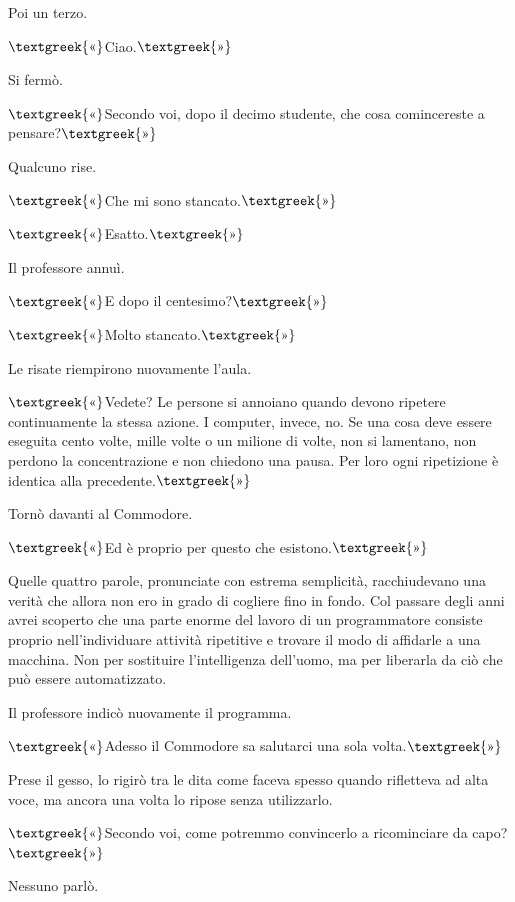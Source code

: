 \documentclass{article}
\begin{document}
Poi un terzo.

$\text{\textgreek{«}}$Ciao.$\text{\textgreek{»}}$

Si fermò.

$\text{\textgreek{«}}$Secondo voi, dopo il decimo studente, che cosa comincereste a pensare?$\text{\textgreek{»}}$

Qualcuno rise.

$\text{\textgreek{«}}$Che mi sono stancato.$\text{\textgreek{»}}$

$\text{\textgreek{«}}$Esatto.$\text{\textgreek{»}}$

Il professore annuì.

$\text{\textgreek{«}}$E dopo il centesimo?$\text{\textgreek{»}}$

$\text{\textgreek{«}}$Molto stancato.$\text{\textgreek{»}}$

Le risate riempirono nuovamente l'aula.

$\text{\textgreek{«}}$Vedete? Le persone si annoiano quando devono ripetere continuamente la stessa azione. I computer,
invece, no. Se una cosa deve essere eseguita cento volte, mille volte o un milione di volte, non si lamentano, non
perdono la concentrazione e non chiedono una pausa. Per loro ogni ripetizione è identica alla
precedente.$\text{\textgreek{»}}$

Tornò davanti al Commodore.

$\text{\textgreek{«}}$Ed è proprio per questo che esistono.$\text{\textgreek{»}}$

Quelle quattro parole, pronunciate con estrema semplicità, racchiudevano una verità che allora non ero in grado di
cogliere fino in fondo. Col passare degli anni avrei scoperto che una parte enorme del lavoro di un programmatore
consiste proprio nell'individuare attività ripetitive e trovare il modo di affidarle a una macchina. Non per sostituire
l'intelligenza dell'uomo, ma per liberarla da ciò che può essere automatizzato.

Il professore indicò nuovamente il programma.

$\text{\textgreek{«}}$Adesso il Commodore sa salutarci una sola volta.$\text{\textgreek{»}}$

Prese il gesso, lo rigirò tra le dita come faceva spesso quando rifletteva ad alta voce, ma ancora una volta lo ripose
senza utilizzarlo.

$\text{\textgreek{«}}$Secondo voi, come potremmo convincerlo a ricominciare da capo?$\text{\textgreek{»}}$

Nessuno parlò.
\end{document}
